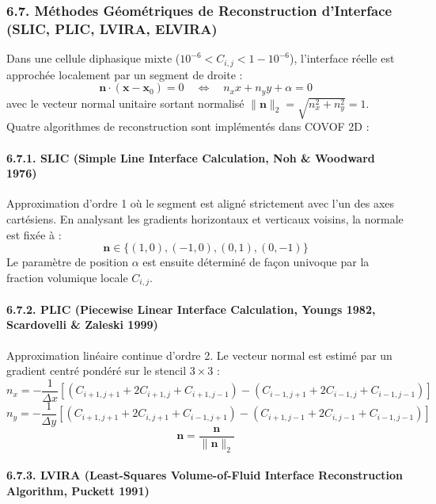 \documentclass[
  french,
]{article}
\begin{document}
\subsubsection{6.7. Méthodes Géométriques de Reconstruction d'Interface
(SLIC, PLIC, LVIRA,
ELVIRA)}\label{muxe9thodes-guxe9omuxe9triques-de-reconstruction-dinterface-slic-plic-lvira-elvira}

Dans une cellule diphasique mixte
(\(10^{-6} < C_{i, j} < 1 - 10^{-6}\)), l'interface réelle est approchée
localement par un segment de droite :
\[\mathbf{n} \cdot (\mathbf{x} - \mathbf{x}_0) = 0 \quad \iff \quad n_x x + n_y y + \alpha = 0\]
avec le vecteur normal unitaire sortant normalisé
\(\|\mathbf{n}\|_2 = \sqrt{n_x^2 + n_y^2} = 1\). Quatre algorithmes de
reconstruction sont implémentés dans COVOF 2D :

\paragraph{6.7.1. SLIC (Simple Line Interface Calculation, Noh \&
Woodward
1976)}\label{slic-simple-line-interface-calculation-noh-woodward-1976}

Approximation d'ordre 1 où le segment est aligné strictement avec l'un
des axes cartésiens. En analysant les gradients horizontaux et verticaux
voisins, la normale est fixée à :
\[\mathbf{n} \in \{ (1, 0), (-1, 0), (0, 1), (0, -1) \}\] Le paramètre
de position \(\alpha\) est ensuite déterminé de façon univoque par la
fraction volumique locale \(C_{i, j}\).

\paragraph{6.7.2. PLIC (Piecewise Linear Interface Calculation, Youngs
1982, Scardovelli \& Zaleski
1999)}\label{plic-piecewise-linear-interface-calculation-youngs-1982-scardovelli-zaleski-1999}

Approximation linéaire continue d'ordre 2. Le vecteur normal est estimé
par un gradient centré pondéré sur le stencil \(3 \times 3\) :
\[n_x = - \frac{1}{\Delta x} \left[ (C_{i+1, j+1} + 2 C_{i+1, j} + C_{i+1, j-1}) - (C_{i-1, j+1} + 2 C_{i-1, j} + C_{i-1, j-1}) \right]\]
\[n_y = - \frac{1}{\Delta y} \left[ (C_{i+1, j+1} + 2 C_{i, j+1} + C_{i-1, j+1}) - (C_{i+1, j-1} + 2 C_{i, j-1} + C_{i-1, j-1}) \right]\]
\[\mathbf{n} = \frac{\mathbf{n}}{\|\mathbf{n}\|_2}\]

\paragraph{6.7.3. LVIRA (Least-Squares Volume-of-Fluid Interface
Reconstruction Algorithm, Puckett
1991)}\label{lvira-least-squares-volume-of-fluid-interface-reconstruction-algorithm-puckett-1991}
\end{document}
